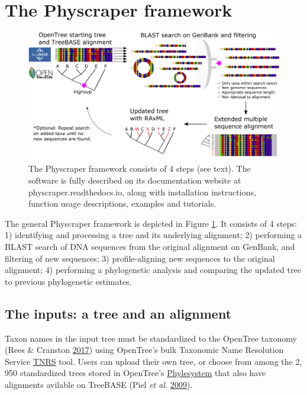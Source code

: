 \documentclass[]{article}
\begin{document}
\hypertarget{the-physcraper-framework}{%
\section{The Physcraper framework}\label{the-physcraper-framework}}

\begin{figure}

{\centering \includegraphics[width=0.85\linewidth]{docs/figs/schematic-3} 

}

\caption{The Physcraper framework consists of 4 steps (see text). The software is fully described on its documentation website at physcraper.readthedocs.io, along with installation instructions, function usage descriptions, examples and tutorials.}\label{fig:framework}
\end{figure}

The general Physcraper framework is depicted in Figure \ref{fig:framework}. It consists of 4 steps: 1) identifying and processing a tree and its underlying alignment; 2) performing a BLAST search of DNA sequences from the original alignment on GenBank, and filtering of new sequences; 3) profile-aligning new sequences to the original alignment; 4) performing a phylogenetic analysis and comparing the updated tree to previous phylogenetic estimates.

\hypertarget{the-inputs-a-tree-and-an-alignment}{%
\subsection{The inputs: a tree and an alignment}\label{the-inputs-a-tree-and-an-alignment}}

Taxon names in the input tree must be standardized to the OpenTree taxonomy (Rees \& Cranston \protect\hyperlink{ref-rees2017automated}{2017}) using OpenTree's bulk Taxonomic Name Resolution Service \href{https://tree.opentreeoflife.org/curator/tnrs/}{TNRS} tool. Users can upload their own tree, or choose from among the 2, 950 standardized trees stored in OpenTree's \href{https://github.com/opentreeoflife/phylesystem}{Phylesystem} that also have alignments avilable on TreeBASE (Piel \emph{et al.} \protect\hyperlink{ref-piel2009treebase}{2009}).
\end{document}
